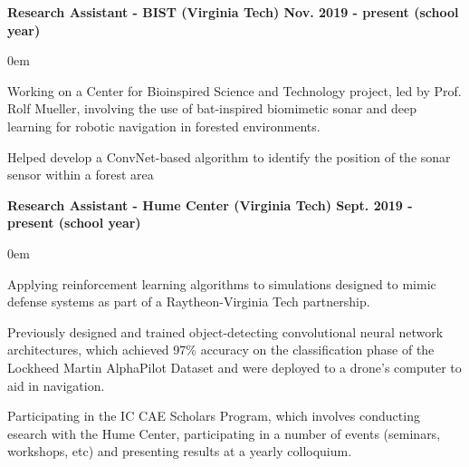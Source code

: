\documentclass{article}
\begin{document}
\begin{center}
\begin{flushleft}
    \textbf{Research Assistant - BIST (Virginia Tech) \hfill Nov. 2019 - present (school year)}
    \begin{compactitem}
      \itemsep0em
      \item Working on a Center for Bioinspired Science and Technology project, led by Prof. Rolf Mueller, involving the use of bat-inspired biomimetic sonar and deep learning for robotic navigation in forested environments.
      \item Helped develop a ConvNet-based algorithm to identify the position of the sonar sensor within a forest area
    \end{compactitem}

    \textbf{Research Assistant - Hume Center (Virginia Tech) \hfill Sept. 2019 - present (school year)}
    \begin{compactitem}
      \itemsep0em
      \item Applying reinforcement learning algorithms to simulations designed to mimic defense systems as part of a Raytheon-Virginia Tech partnership.
      \item Previously designed and trained object-detecting convolutional neural network architectures, which achieved 97\% accuracy on the classification phase of the Lockheed Martin AlphaPilot Dataset and were deployed to a drone's computer to aid in navigation.
      \item Participating in the IC CAE Scholars Program, which involves conducting esearch with the Hume Center, participating in a number of events (seminars, workshops, etc) and presenting results at a yearly colloquium.
    \end{compactitem}


\end{flushleft}
\end{center}
\end{document}
